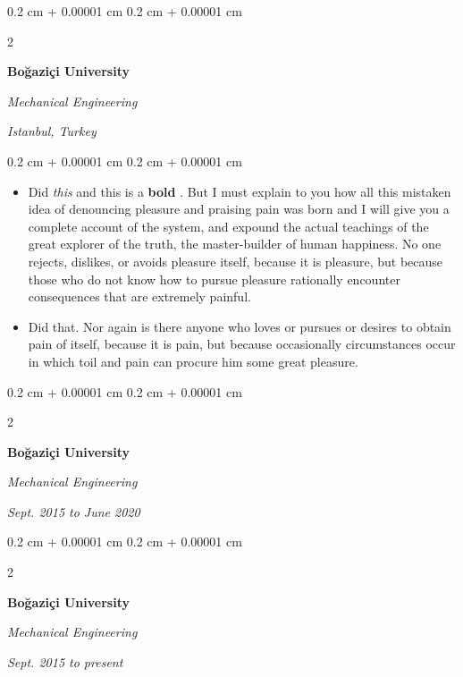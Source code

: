 \documentclass[10pt, letterpaper]{article}
\newenvironment{highlights}{
    \begin{itemize}[
        topsep=0.10 cm,
        parsep=0.10 cm,
        partopsep=0pt,
        itemsep=0pt,
        leftmargin=0.4 cm + 10pt
    ]
}{
    \end{itemize}
} %
\newenvironment{onecolentry}{
    \begin{adjustwidth}{
        0.2 cm + 0.00001 cm
    }{
        0.2 cm + 0.00001 cm
    }
}{
    \end{adjustwidth}
} %
\newenvironment{twocolentry}[2][]{
    \onecolentry
    \def\secondColumn{#2}
    \setcolumnwidth{\fill, 4.5 cm}
    \begin{paracol}{2}
}{
    \switchcolumn \raggedleft \secondColumn
    \end{paracol}
    \endonecolentry
} %
\let\hrefWithoutArrow\href
\renewcommand{\href}[2]{\hrefWithoutArrow{#1}{\mbox{\ifthenelse{\equal{#2}{}}{ }{#2 }\raisebox{.15ex}{\footnotesize \faExternalLink*}}}}
\begin{document}
        \vspace{0.2 cm-3px}

        \begin{twocolentry}{
        \textit{Istanbul, Turkey}    
            
        }
            \textbf{Boğaziçi University}

            \textit{Mechanical Engineering}
        \end{twocolentry}

        \vspace{0.10 cm-3px}
        \begin{onecolentry}
            \begin{highlights}
                \item Did \textit{this} and this is a \textbf{bold} \href{https://example.com}{link}. But I must explain to you how all this mistaken idea of denouncing pleasure and praising pain was born and I will give you a complete account of the system, and expound the actual teachings of the great explorer of the truth, the master-builder of human happiness. No one rejects, dislikes, or avoids pleasure itself, because it is pleasure, but because those who do not know how to pursue pleasure rationally encounter consequences that are extremely painful.
                \item Did that. Nor again is there anyone who loves or pursues or desires to obtain pain of itself, because it is pain, but because occasionally circumstances occur in which toil and pain can procure him some great pleasure.
            \end{highlights}
        \end{onecolentry}


        \vspace{0.2 cm-3px}

        \begin{twocolentry}{
            
            
        \textit{Sept. 2015 to June 2020}}
            \textbf{Boğaziçi University}

            \textit{Mechanical Engineering}
        \end{twocolentry}



        \vspace{0.2 cm-3px}

        \begin{twocolentry}{
            
            
        \textit{Sept. 2015 to present}}
            \textbf{Boğaziçi University}

            \textit{Mechanical Engineering}
        \end{twocolentry}
\end{document}
